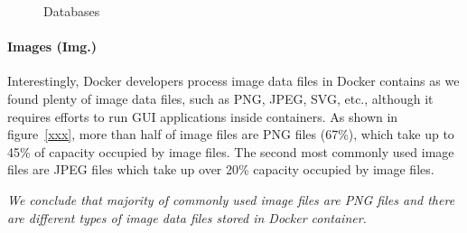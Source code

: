\begin{figure}
	\centering
	\caption{Databases}
	\label{fig:arc-db}
\end{figure} 

\paragraph{Images (Img.)}

Interestingly, Docker developers process image data files in Docker contains as we found plenty of image data files, such as PNG, JPEG, SVG, etc., although it requires efforts to run GUI applications inside containers.
As shown in figure~\ref{xxx}, more than half of image files are PNG files (67\%), which take up to 45\% of capacity occupied by image files. The second most commonly used image files are JPEG files which take up over 20\% capacity occupied by image files.

\textit{We conclude that majority of commonly used image files are PNG files and there are different types of image data files stored in Docker container.}

